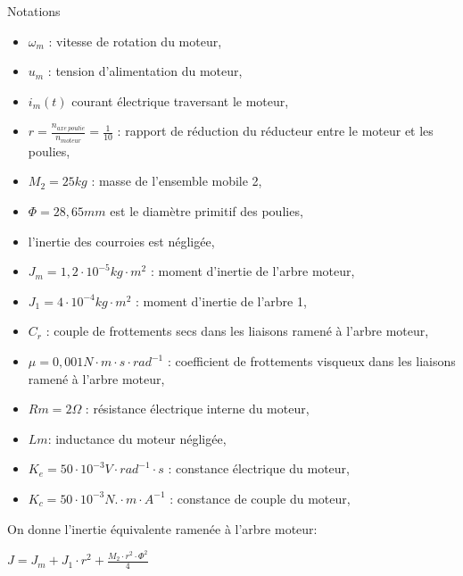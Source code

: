 Notations
\begin{itemize}
 \item $\omega_m$ : vitesse de rotation du moteur,
 \item $u_m$ : tension d'alimentation du moteur,
 \item $i_m(t)$ courant électrique traversant le moteur,
 \item $r=\frac{n_{axe\ poulie}}{n_{moteur}}=\frac{1}{10}$ : rapport de réduction du réducteur entre le moteur et les poulies,
 \item $M_2=25kg$ : masse de l’ensemble mobile 2,
 \item $\Phi=28,65mm$ est le diamètre primitif des poulies,
 \item l’inertie des courroies est négligée,
 \item $J_m=1,2\cdot 10^{-5}kg\cdot m^2$ : moment d’inertie de l’arbre moteur,
 \item $J_1=4\cdot 10^{-4} kg\cdot m^2$ : moment d’inertie de l’arbre 1,
 \item $C_r$ : couple de frottements secs dans les liaisons ramené à l’arbre moteur,
 \item $\mu=0,001 N\cdot m\cdot s\cdot rad^{-1}$ : coefficient de frottements visqueux dans les liaisons ramené à l’arbre moteur,
 \item $Rm=2\Omega$ : résistance électrique interne du moteur,
 \item $Lm$: inductance du moteur négligée,
 \item $K_e=50\cdot 10^{-3}V\cdot rad^{-1}\cdot s$ : constance électrique du moteur,
 \item $K_c=50\cdot 10^{-3}N.\cdot m\cdot A^{-1}$ : constance de couple du moteur,
\end{itemize}



On donne l'inertie équivalente ramenée à l'arbre moteur:

\begin{center}
$J=J_m+J_1\cdot r^2+\frac{M_2\cdot r^2\cdot \Phi^2}{4}$
\end{center}


